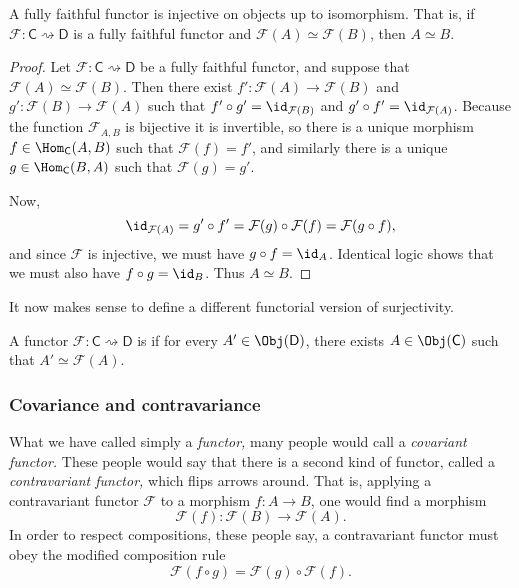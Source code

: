 \documentclass[main.tex]{subfiles}
\begin{document}
\begin{lemma}
  \label{lemma:fullyfaithfulfunctorinjectiveuptoisomorphism}
  A fully faithful functor is injective on objects up to isomorphism. That is, if  $\mathcal{F}\colon \mathsf{C} \rightsquigarrow \mathsf{D}$ is a fully faithful functor and $\mathcal{F}(A) \simeq \mathcal{F}(B)$, then $A \simeq B$.
\end{lemma}
\begin{proof}
  Let $\mathcal{F}\colon \mathsf{C} \rightsquigarrow \mathsf{D}$ be a fully faithful functor, and suppose that $\mathcal{F}(A) \simeq \mathcal{F}(B)$. Then there exist $f'\colon \mathcal{F}(A) \to \mathcal{F}(B)$ and $g'\colon \mathcal{F}(B) \to \mathcal{F}(A)$ such that $f' \circ g' = \id_{\mathcal{F}(B)}$ and $g' \circ f' = \id_{\mathcal{F}(A)}$. Because the function $\mathcal{F}_{A, B}$ is bijective it is invertible, so there is a unique morphism $f \in \Hom_{\mathsf{C}}(A, B)$ such that $\mathcal{F}(f) = f'$, and similarly there is a unique $g \in \Hom_{\mathsf{C}}(B, A)$ such that $\mathcal{F}(g) = g'$.

  Now,
  \begin{equation*}
    \id_{\mathcal{F}(A)} = g' \circ f' = \mathcal{F}(g) \circ \mathcal{F}(f) = \mathcal{F}(g \circ f),
  \end{equation*}
  and since $\mathcal{F}$ is injective, we must have $g \circ f = \id_{A}$. Identical logic shows that we must also have $f \circ g = \id_{B}$. Thus $A \simeq B$.
\end{proof}

It now makes sense to define a different functorial version of surjectivity.

\begin{definition}
  \label{def:essentiallysurjective}
  A functor $\mathcal{F}\colon \mathsf{C} \rightsquigarrow \mathsf{D}$ is  if for every $A' \in \Obj(\mathsf{D})$, there exists $A \in \Obj(\mathsf{C})$ such that $A' \simeq \mathcal{F}(A)$.
\end{definition}


\subsubsection{Covariance and contravariance}

What we have called simply a \emph{functor,} many people would call a \emph{covariant functor.} These people would say that there is a second kind of functor, called a \emph{contravariant functor,} which flips arrows around. That is, applying a contravariant functor $\mathcal{F}$ to a morphism $f\colon A \to  B$, one would find a morphism
\begin{equation*}
  \mathcal{F}(f)\colon \mathcal{F}(B) \to \mathcal{F}(A).
\end{equation*}
In order to respect compositions, these people say, a contravariant functor must obey the modified composition rule
\begin{equation*}
  \mathcal{F}(f \circ g) = \mathcal{F}(g) \circ \mathcal{F}(f).
\end{equation*}
\end{document}
